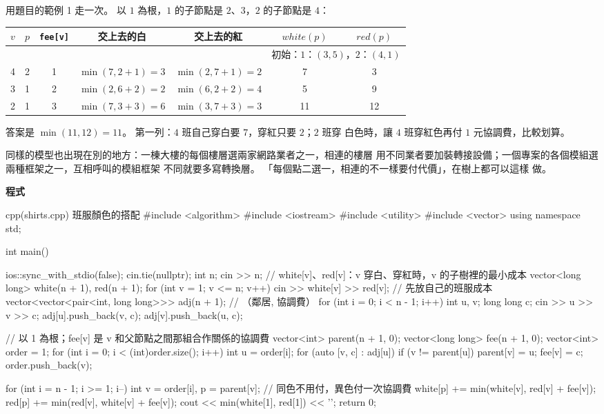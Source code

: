 用題目的範例 1 走一次。 以 $1$ 為根，$1$ 的子節點是 $2$、$3$，$2$ 的子節點是 $4$：

\begin{center}
\begin{tabular}{ccccccc}
\toprule
$v$ & $p$ & \texttt{fee[v]} & 交上去的白 & 交上去的紅 & $\mathit{white}(p)$ & $\mathit{red}(p)$ \\
\midrule
 & & & & & \multicolumn{2}{c}{初始：$1$：$(3, 5)$，$2$：$(4, 1)$} \\
4 & 2 & 1 & $\min(7, 2 + 1) = 3$ & $\min(2, 7 + 1) = 2$ & 7 & 3 \\
3 & 1 & 2 & $\min(2, 6 + 2) = 2$ & $\min(6, 2 + 2) = 4$ & 5 & 9 \\
2 & 1 & 3 & $\min(7, 3 + 3) = 6$ & $\min(3, 7 + 3) = 3$ & 11 & 12 \\
\bottomrule
\end{tabular}
\end{center}

答案是 $\min(11, 12) = 11$。 第一列：$4$ 班自己穿白要 $7$，穿紅只要 $2$；$2$ 班穿
白色時，讓 $4$ 班穿紅色再付 $1$ 元協調費，比較划算。

同樣的模型也出現在別的地方：一棟大樓的每個樓層選兩家網路業者之一，相連的樓層
用不同業者要加裝轉接設備；一個專案的各個模組選兩種框架之一，互相呼叫的模組框架
不同就要多寫轉換層。 「每個點二選一，相連的不一樣要付代價」，在樹上都可以這樣
做。

\textbf{程式}

\begin{example}[label=ex:tdp-shirts]{cpp}{(shirts.cpp) 班服顏色的搭配}
#include <algorithm>
#include <iostream>
#include <utility>
#include <vector>
using namespace std;

int main() {
    ios::sync_with_stdio(false);
    cin.tie(nullptr);
    int n;
    cin >> n;
    // white[v]、red[v]：v 穿白、穿紅時，v 的子樹裡的最小成本
    vector<long long> white(n + 1), red(n + 1);
    for (int v = 1; v <= n; v++) {
        cin >> white[v] >> red[v];          // 先放自己的班服成本
    }
    vector<vector<pair<int, long long>>> adj(n + 1);   // （鄰居, 協調費）
    for (int i = 0; i < n - 1; i++) {
        int u, v;
        long long c;
        cin >> u >> v >> c;
        adj[u].push_back({v, c});
        adj[v].push_back({u, c});
    }

    // 以 1 為根；fee[v] 是 v 和父節點之間那組合作關係的協調費
    vector<int> parent(n + 1, 0);
    vector<long long> fee(n + 1, 0);
    vector<int> order = {1};
    for (int i = 0; i < (int)order.size(); i++) {
        int u = order[i];
        for (auto [v, c] : adj[u]) {
            if (v != parent[u]) {
                parent[v] = u;
                fee[v] = c;
                order.push_back(v);
            }
        }
    }

    for (int i = n - 1; i >= 1; i--) {
        int v = order[i], p = parent[v];
        // 同色不用付，異色付一次協調費
        white[p] += min(white[v], red[v] + fee[v]);
        red[p] += min(red[v], white[v] + fee[v]);
    }
    cout << min(white[1], red[1]) << '\n';
    return 0;
}
\end{example}

